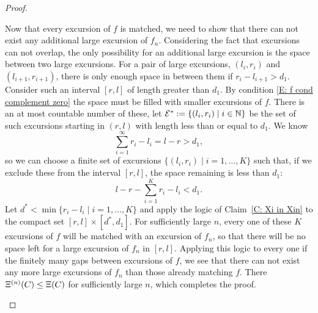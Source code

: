 \begin{proof}
\begin{proofpart} \label{PP: Xin in Xi}
Now that every excursion of $f$ is matched, 
we need to show that there can not exist any additional large excursion of $f_n$.
Considering the fact that excursions can not overlap,
the only possibility for an additional large excursion is the space between two large excursions.
For a pair of large excursions,
$(l_i, r_i)$ and $(l_{i+1}, r_{i+1})$,
there is only enough space in between them if
$r_i - l_{i+1} > d_1$.
Consider such an interval $[r,l]$ of length greater than $d_1$.
By condition \eqref{E: f cond complement zero} the space must be filled with smaller excursions of $f$.
There is an at most countable number of these,
let $\mathcal{E^*} := \{ (l_i, r_i) \; | \; i \in \mathbb{N} \}$
be the set of such excursions starting in $(r,l)$ with length less than or equal to $d_1$.
We know
\begin{equation} 
\sum_{i=1}^{\infty} r_i - l_i = l - r > d_1,
\end{equation}
so we can choose a finite set of excursions
$\{ (l_i, r_i) \; | \; i = 1, \dots, K \}$
such that, 
if we exclude these from the interval $[r,l]$, 
the space remaining is less than $d_1$:
\begin{equation}
l-r - \sum_{i=1}^{K} r_i - l_i < d_1.
\end{equation}
Let $d^* < \min \{ r_i - l_i \; | \; i = 1, \dots, K \}$
and apply the logic of Claim~\ref{C: Xi in Xin} to the compact set
$[r, l] \times [d^*, d_1]$.
For sufficiently large $n$, 
every one of these $K$ excursions of $f$ will be matched with an excursion of $f_n$,
so that there will be no space left for a large excursion of $f_n$ in $[r,l]$.
Applying this logic to every one if the finitely many gaps between excursions of $f$,
we see that there can not exist any more large excursions of $f_n$  than those already matching $f$.
There $\Xi^{(n)}(C) \leq \Xi(C)$ for sufficiently large $n$, which completes the proof.
\end{proofpart}
\end{proof}



